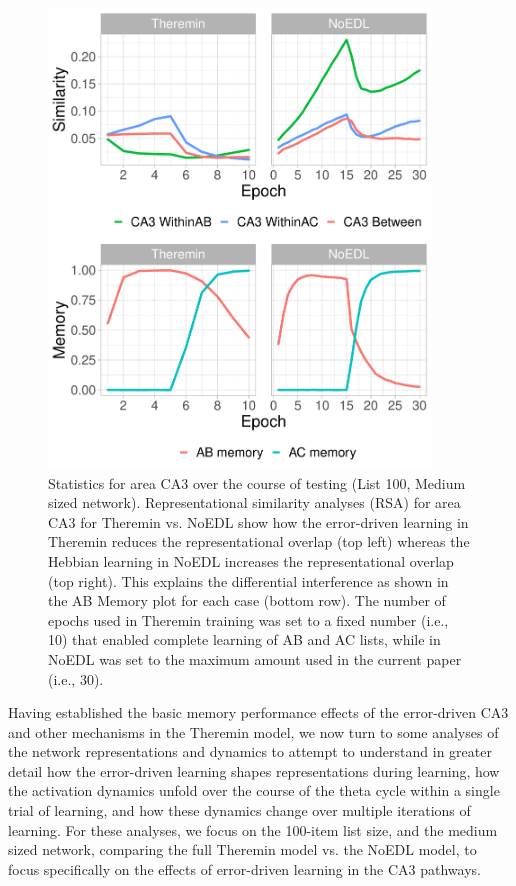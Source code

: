 \documentclass[11pt,twoside]{article}
\newif\myifpdf
\begin{document}
\begin{figure}
  \centering\includegraphics[width=4in]{fig_hip_edl_test_stats}
  \caption{\footnotesize Statistics for area CA3 over the course of testing (List 100, Medium sized network). Representational similarity analyses (RSA) for area CA3 for Theremin vs. NoEDL show how the error-driven learning in Theremin reduces the representational overlap (top left) whereas the Hebbian learning in NoEDL increases the representational overlap (top right).  This explains the differential interference as shown in the AB Memory plot for each case (bottom row). The number of epochs used in Theremin training was set to a fixed number (i.e., 10) that enabled complete learning of AB and AC lists, while in NoEDL was set to the maximum amount used in the current paper (i.e., 30).}
\label{fig.test_stats}
\end{figure}

Having established the basic memory performance effects of the error-driven CA3 and other mechanisms in the Theremin model, we now turn to some analyses of the network representations and dynamics to attempt to understand in greater detail how the error-driven learning shapes representations during learning, how the activation dynamics unfold over the course of the theta cycle within a single trial of learning, and how these dynamics change over multiple iterations of learning.  For these analyses, we focus on the 100-item list size, and the medium sized network, comparing the full Theremin model vs. the NoEDL model, to focus specifically on the effects of error-driven learning in the CA3 pathways.
\end{document}

